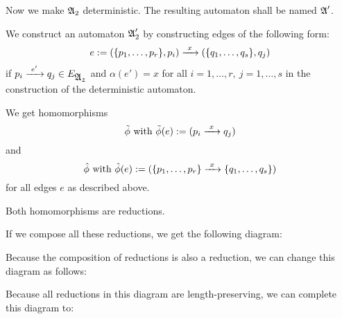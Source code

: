 Now we make $\mbox{$\mathfrak{A}$}_2$ deterministic. The resulting automaton shall be named
$\mbox{$\mathfrak{A}$}'$.

We construct an automaton $\mbox{$\mathfrak{A}$}_2'$ by constructing edges of the following
form:
\[ e := (\mbox{$\{p_1, \ldots, p_r\}$}, p_i) \xrightarrow{\ {x}\ } (\mbox{$\{q_1, \ldots, q_s\}$},
q_j) \] if $p_i \xrightarrow{\ {e'}\ } q_j \in E_{\mbox{$\mathfrak{A_2}$}}$ and $\alpha(e') = x$ for all $i = 1,
\ldots,r,\ j = 1, \ldots, s$ in the construction of the deterministic automaton.

We get homomorphisms
\[ \tilde{\phi} \mbox{ with } \tilde{\phi}(e) := (p_i \xrightarrow{\ {x}\ } q_j) \]
and 
\[ \hat{\phi} \mbox{ with } \hat{\phi}(e) := (\mbox{$\{p_1, \ldots, p_r\}$} \xrightarrow{\ {x}\ }
\mbox{$\{q_1, \ldots, q_s\}$}) \]
for all edges $e$ as described above.

Both homomorphisms are reductions.

If we compose all these reductions, we get the following diagram:

\begin{center}
\end{center}

Because the composition of reductions is also a reduction, we can change this
diagram as follows:

\begin{center}
\end{center}

Because all reductions in this diagram are length-preserving, we can complete
this diagram to:

\begin{center}
\end{center}

